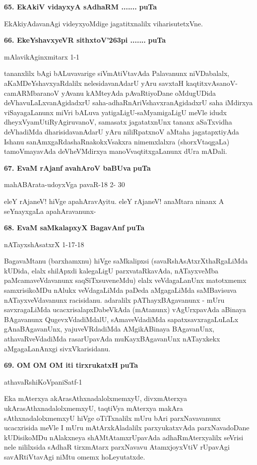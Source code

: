 \medskip
\noindent
\textbf{65. EkAkiV vidayxyA sAdhaRM .......} \hfill{\bf puTa \pageref{86b}}

\smallskip
EkAkiyAdavanAgi videyxyoMdige jagatitxnalilx viharisutetxVne.

\eject

\noindent
\textbf{66. EkeYshavxyeVR sithxtoV\char'263pi .......} \hfill{\bf puTa \pageref{243a}}

\hfill{mAlavikAginxmitarx 1-1}

\smallskip
tananxlilx bAgi bALuvavarige siVmAtiVtavAda Palavanunx niVDabalalx, aKaMDeYshavxyaRdalilx nelesidavanAdarU yAru savxtaH kaqtitxvAsanoV-camARMbaranoV yAvanu kAMteyAda pAvaRtiyoDane oMdugUDida deVhavuLaLxvanAgidadxrU saha-adhaRnAriVshavxranAgidadxrU saha iMdirxya viSayagaLanunx miVri bALuva yatigaLigU-saMyamigaLigU meVle idudx dheyxVyamUtiRyAgiruvanoV, samasatx jagatatxnUnx tananx aSaTxvidha deVhadiMda dharisidavanAdarU yAru niliRpatxnoV aMtaha jagatapxtiyAda Ishanu sanAmxgaRdashaRnakokxVsakxra nimemxlalxra (shorxVtaqgaLa) tamoVmayavAda deVheVMdirxya manoVvaqtitxgaLanunx dUra mADali.


\medskip
\noindent
\textbf{67. EvaM rAjanf avahAroV baBUva} \hfill{\bf puTa \pageref{224a}}

\hfill{mahABArata-udoyxVga pavaR-18 2- 30}

\smallskip
eleY rAjaneV! hiVge apahAravAyitu. eleY rAjaneV! anaMtara ninanx A seYnayxgaLa apahAravanunx-

\medskip
\noindent
\textbf{68. EvaM saMkalapxyX BagavAnf} \hfill{\bf puTa \pageref{242}}

\hfill{nATayxshAsatxrX 1-17-18}

\smallskip
BagavaMtanu (barxhamxnu) hiVge saMkalipxsi (savaRshAsAtxrXthaRgaLiMda kUDida, elalx shilApxdi kalegaLigU parxvataRkavAda, nATayxveMba paMcamaveVdavanunx saqSiTxsuveneMdu) elalx veVdagaLanUnx matotxmemx samxrisikoMDu nAlukx veVdagaLiMda paDeda aMgagaLiMda saMBavisuva nATayxveVdavanunx racisidanu. adaralilx pAThayxBAgavanunx - mUru savxragaLiMda ucacxrisalapxDabeVkAda (mAtanunx) vAgUrxpavAda aBinaya BAgavanunx QugevxVdadiMdalU, sAmaveVdadiMda sapatxsavxragaLuLaLx gAnaBAgavanUnx, yajuveVRdadiMda AMgikABinaya BAgavanUnx, athavaRveVdadiMda rasarUpavAda muKayxBAgavanUnx nATayxkekx aMgagaLanAnxgi sivxVkarisidanu.


\smallskip
\noindent
\textbf{69. OM OM OM iti tirxrukatxH} \hfill{\bf puTa \pageref{146a}}

\hfill{athavaRshiKoVpaniSatf-1}

\smallskip
Eka mAterxya akArasAthxnadalolxmemxyU, divxmAterxya ukArasAthxnadalolxmemxyU, taqtiVya mAterxya makAra sAthxnadalolxmemxyU hiVge oTiTxnalilx mUru bAri parxNavavanunx ucacxrisida meVle I mUru mAtArxkAladalilx parxyukatxvAda parxNavadoDane kUDisikoMDu nAlakxneya shAMtAtamxrUpavAda adhaRmAterxyalilx seVrisi nele nililxsida sAdhaR tirxmAtarx parxNavavu AtamxjoyxVtiV rUpavAgi savARtiVtavAgi niMtu omemx hoLeyutatxde.

